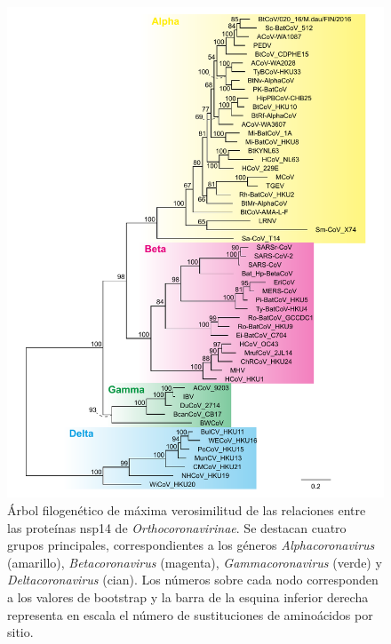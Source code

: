 \begin{figure}[H]
    \centering
    \includegraphics[width=1\textwidth]{img/fig6.pdf}
    \caption{Árbol filogenético de máxima verosimilitud de las relaciones 
    entre las proteínas nsp14 de \textit{Orthocoronavirinae}. Se destacan 
    cuatro grupos principales, correspondientes a los géneros
    \textit{Alphacoronavirus} (amarillo), \textit{Betacoronavirus}
    (magenta), \textit{Gammacoronavirus} (verde) y \textit{Deltacoronavirus} 
    (cian). Los números sobre cada nodo corresponden a los valores de 
    bootstrap y la barra de la esquina inferior derecha representa en 
    escala el número de sustituciones de aminoácidos por sitio.}\label{fig:nsp14tree}
\end{figure}

